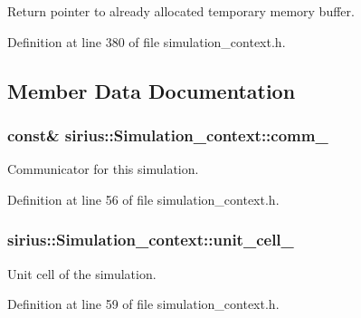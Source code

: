 Return pointer to already allocated temporary memory buffer. 



Definition at line 380 of file simulation\+\_\+context.\+h.



\subsection{Member Data Documentation}
\hypertarget{classsirius_1_1_simulation__context_aaa69d34673366ac3c0b9ce68755d3876}{}
\subsubsection[{comm\+\_\+}]{ const\& sirius\+::\+Simulation\+\_\+context\+::comm\+\_\+\hspace{0.3cm}{\ttfamily [private]}}\label{classsirius_1_1_simulation__context_aaa69d34673366ac3c0b9ce68755d3876}


Communicator for this simulation. 



Definition at line 56 of file simulation\+\_\+context.\+h.

\hypertarget{classsirius_1_1_simulation__context_a5d0442d2307a97f467360ad68705decb}{}
\subsubsection[{unit\+\_\+cell\+\_\+}]{ sirius\+::\+Simulation\+\_\+context\+::unit\+\_\+cell\+\_\+\hspace{0.3cm}{\ttfamily [private]}}\label{classsirius_1_1_simulation__context_a5d0442d2307a97f467360ad68705decb}


Unit cell of the simulation. 



Definition at line 59 of file simulation\+\_\+context.\+h.

\hypertarget{classsirius_1_1_simulation__context_aa39fe9cd213f9eaa7999bb95346de9b1}{}
